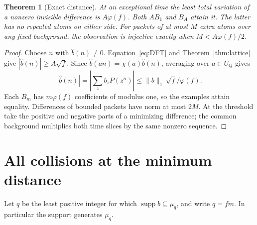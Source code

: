 \documentclass[11pt,letterpaper]{article}
\newtheorem{theorem}{Theorem}[section]
\newcommand{\supp}{\operatorname{supp}}
\newcommand{\abs}[1]{\left|#1\right|}
\begin{document}
\begin{theorem}[Exact distance]\label{thm:dist}
At an exceptional time the least total variation of a nonzero invisible difference is $A\varphi(f)$. Both $AB_1$ and $B_A$ attain it. The latter has no repeated atoms on either side. For packets of at most $M$ extra atoms over any fixed background, the observation is injective exactly when $M<A\varphi(f)/2$.
\end{theorem}
\begin{proof}
Choose $n$ with $\widehat b(n)\ne0$. Equation~\eqref{eq:DFT} and Theorem~\ref{thm:lattice} give $|\widehat b(n)|\ge A\sqrt f$. Since $\widehat b(an)=\chi(a)\widehat b(n)$, averaging over $a\in U_Q$ gives
\[
 |\widehat b(n)|=\abs{\sum_z b_zP(z^n)}
       \le \|b\|_1\,\sqrt f/\varphi(f).
\]
Each $B_m$ has $m\varphi(f)$ coefficients of modulus one, so the examples attain equality. Differences of bounded packets have norm at most $2M$. At the threshold take the positive and negative parts of a minimizing difference; the common background multiplies both time slices by the same nonzero sequence.
\end{proof}

\section{All collisions at the minimum distance}

Let $q$ be the least positive integer for which $\supp b\subseteq\mu_q$, and write $q=fm$. In particular the support generates $\mu_q$.
\end{document}

